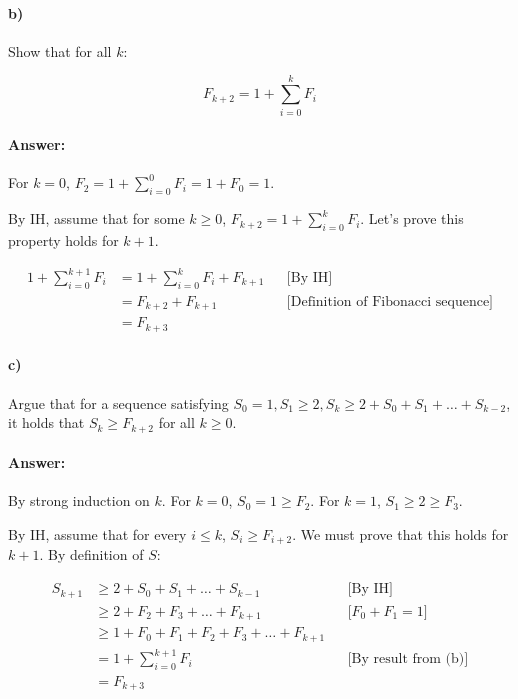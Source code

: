 \documentclass[a4paper]{article}
\begin{document}
\paragraph{b)} Show that for all $k$:

$$F_{k+2} = 1 + \sum\limits_{i=0}^k F_i$$

\paragraph{Answer:}

For $k = 0$, $F_2 = 1 + \sum\limits_{i=0}^0 F_i = 1 + F_0 = 1$.

By IH, assume that for some $k \ge 0$, $F_{k+2} = 1 + \sum\limits_{i=0}^k F_i$. Let's prove this property holds for $k+1$.

\begin{align*}
1 + \sum\limits_{i=0}^{k+1} F_i & =  1 + \sum\limits_{i=0}^{k} F_i + F_{k+1} && \text{[By IH]} \\
& = F_{k+2} + F_{k+1} && \text{[Definition of Fibonacci sequence]} \\
& = F_{k+3}
\end{align*}

\paragraph{c)} Argue that for a sequence satisfying $S_0 = 1, S_1 \ge 2, S_k \ge 2 + S_0 + S_1 + \ldots + S_{k-2}$, it holds that $S_k \ge F_{k+2}$ for all $k \ge 0$.

\paragraph{Answer:}

By strong induction on $k$. For $k=0$, $S_0 = 1 \ge F_{2}$. For $k=1$, $S_1 \ge 2 \ge F_3$.

By IH, assume that for every $i \le k$, $S_i \ge F_{i+2}$. We must prove that this holds for $k+1$. By definition of $S$:

\begin{align*}
S_{k+1} & \ge 2 + S_0 + S_1 + \ldots + S_{k-1} && \text{[By IH]}\\
& \ge 2 + F_2 + F_3 + \ldots + F_{k+1} && \text{[$F_0 + F_1 = 1$]} \\
& \ge 1 + F_0 + F_1 + F_2 + F_3 + \ldots + F_{k+1} \\
& = 1 + \sum\limits_{i=0}^{k+1} F_i && \text{[By result from (b)]} \\
& = F_{k+3}
\end{align*}
\end{document}
